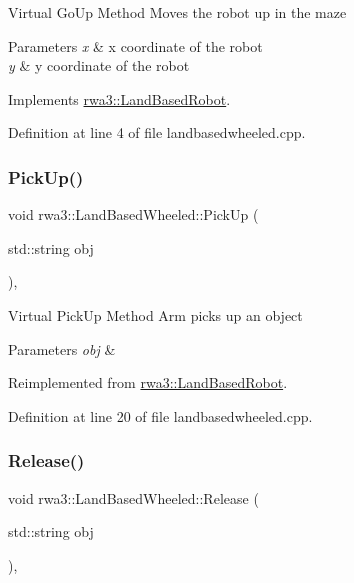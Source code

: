 Virtual Go\+Up Method Moves the robot up in the maze 
\begin{DoxyParams}{Parameters}
{\em x} & x coordinate of the robot \\
\hline
{\em y} & y coordinate of the robot \\
\hline
\end{DoxyParams}


Implements \hyperlink{classrwa3_1_1_land_based_robot_a955b0741cce58648074edff80ac1ce29}{rwa3\+::\+Land\+Based\+Robot}.



Definition at line 4 of file landbasedwheeled.\+cpp.

\mbox{\label{classrwa3_1_1_land_based_wheeled_aa82a9a72c4452ba203edc4c9ef0ad6c6}} 
\subsubsection{\texorpdfstring{Pick\+Up()}{PickUp()}}
{\footnotesize\ttfamily void rwa3\+::\+Land\+Based\+Wheeled\+::\+Pick\+Up (\begin{DoxyParamCaption}\item[{std\+::string}]{obj }\end{DoxyParamCaption})\hspace{0.3cm}{\ttfamily [override]}, {\ttfamily [virtual]}}

Virtual Pick\+Up Method Arm picks up an object 
\begin{DoxyParams}{Parameters}
{\em obj} & \\
\hline
\end{DoxyParams}


Reimplemented from \hyperlink{classrwa3_1_1_land_based_robot_adf0c76440e2f9d2ea5cbe7193cddfe2b}{rwa3\+::\+Land\+Based\+Robot}.



Definition at line 20 of file landbasedwheeled.\+cpp.

\mbox{\label{classrwa3_1_1_land_based_wheeled_af4bd6e50a4a6d30186c969add4d9c954}} 
\subsubsection{\texorpdfstring{Release()}{Release()}}
{\footnotesize\ttfamily void rwa3\+::\+Land\+Based\+Wheeled\+::\+Release (\begin{DoxyParamCaption}\item[{std\+::string}]{obj }\end{DoxyParamCaption})\hspace{0.3cm}{\ttfamily [override]}, {\ttfamily [virtual]}}

